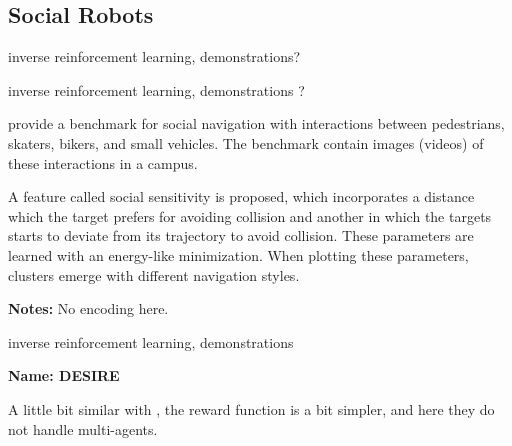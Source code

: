 \subsection{Social Robots}\label{subsec: social robots}


\cite{vasquez2014inverse} inverse reinforcement learning, demonstrations?


\cite{okal2016learning} inverse reinforcement learning, demonstrations ?


\cite{robicquet2016learning} provide a benchmark for social navigation with interactions between pedestrians, skaters, bikers, and small vehicles. 
%
The benchmark contain images (videos) of these interactions in a campus.

A feature called social sensitivity is proposed, which incorporates a distance which the target prefers for avoiding collision and another in which the targets starts to deviate from its trajectory to avoid collision.
%
These parameters are learned with an energy-like minimization.
%
When plotting these parameters, clusters emerge with different navigation styles.

\textbf{Notes:} No encoding here. 


\cite{kretzschmar2016socially} inverse reinforcement learning, demonstrations


\textbf{Name: DESIRE}

\cite{lee2017desire}




\cite{chen2017decentralized} A little bit similar with \cite{chen2017socially}, the reward function  is a bit simpler, and here they do not handle multi-agents. 

